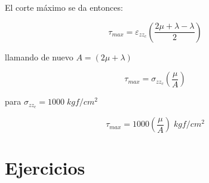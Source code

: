 \documentclass[../notas medios.tex]{subfiles}
\begin{document}
\begin{enumerate}
\begin{itemize}
El corte máximo se da entonces: 

\[\tau_{max} = \varepsilon _{zz_c}  \left(\dfrac{2\mu + \lambda - \lambda}{2}\right)\]

llamando de nuevo $A = (2 \mu + \lambda)$

\[\tau_{max} = \sigma_{zz_c} \left(\dfrac{\mu}{A}\right)\]

para  $\sigma_{zz_c} = 1000 \; kgf/cm^2$

\[\tau_{max} = 1000 \left(\dfrac{\mu}{A}\right) \; kgf/cm^2\] 

\end{itemize}

\end{enumerate}

\section{Ejercicios}
\end{document}
